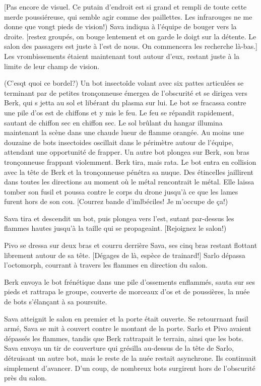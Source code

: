 [Pas encore de visuel. Ce putain d'endroit est si grand et rempli de toute cette merde poussiéreuse, qui semble agir comme des paillettes. Les infrarouges ne me donne que vongt pieds de vision!) Sava indiqua à l'équipe de bouger vers la droite. [restez groupés, on bouge lentement et on garde le doigt sur la détente. Le salon des passagers est juste à l'est de nous. On commencera les recherche là-bas.] Les vrombissements étaient maintenant tout autour d'eux, restant juste à la limite de leur champ de vision. 

(C'esqt quoi ce bordel?) Un bot insectoîde volant avec six pattes articulées se terminant par de petites tronçonneuse émergea de l'obscurité et se dirigea vers Berk, qui s jetta au sol et libérant du plasma sur lui. Le bot se fracassa contre une pile d'os est de chiffons et y mis le feu. Le feu se répandit rapidement, sautant de chiffon sec en chiffon sec. Le sol brûlant du hangar illumina maintenant la scène dans une chaude lueur de flamme orangée. Au moins une douzaine de bots insectoides oscillait dans le périmètre autour de l'équipe, attendant une opportunité de frapper. Un autre bot plongea sur Berk, son bras tronçonneuse frappant violemment. Berk tira, mais rata. Le bot entra en collision avec la tête de Berk et la tronçonneuse pénétra sa nuque. Des étincelles jaillirent dans toutes les directions au moment où le métal rencontrait le métal. Elle laissa tomber son fusil et poussa contre le corps du drone jusqu'à ce que les lames furent hors de son cou. [Courrez bande d'imlbéciles! Je m'occupe de ça!) 

Sava tira et descendit un bot, puis plongea vers l'est, sutant par-dessus les flammes hautes jusqu'à la taille qui se propageaint. [Rejoignez le salon!) 

Pivo se dressa sur deux bras et courru derrière Sava, ses cinq bras restant flottant librement autour de sa tête. [Dégages de là, espèce de trainard!] Sarlo dépassa l'octomorph, courrant à travers les flammes en direction du salon. 

Berk envoya le bot frénétique dans une pile d'ossements enflammés, sauta sur ses pieds et rattrapa le groupe, couverte de morceaux d'os et de poussières, la nuée de bots s'élançant à sa poursuite. 

Sava atteignit le salon en premier et la porte était ouverte. Se retourrnant fusil armé, Sava se mit à couvert contre le montant de la porte. Sarlo et Pivo avaient dépassés les flammes, tandis que Berk rattrapait le terrain, ainsi que les bots. Sava envoya un tir de couverture qui grésilla au-dessus de la tête de Sarlo, détruisant un autre bot, mais le reste de la nuée restait asynchrone. Ils continuait simplement d'avancer. D'un coup, de nombreux bots surgirent hors de l'obscurité près du salon. 

